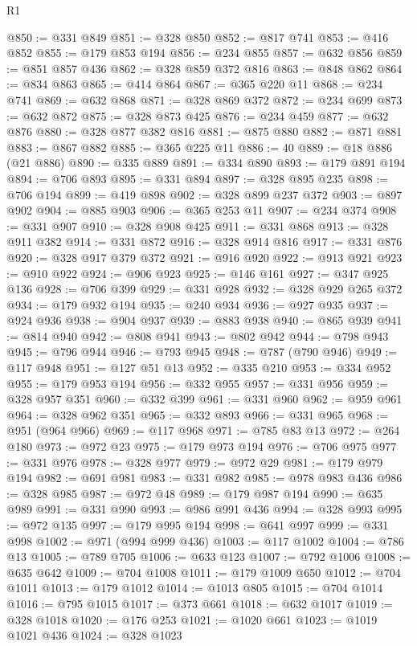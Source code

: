 \begin{lexlean}{R1}
\begin{coremodule}
@850 := @331 @849
@851 := @328 @850
@852 := @817 @741
@853 := @416 @852
@855 := @179 @853 @194
@856 := @234 @855
@857 := @632 @856
@859 := @851 @857 @436
@862 := @328 @859 @372 @816
@863 := @848 @862
@864 := @834 @863
@865 := @414 @864
@867 := @365 @220 @11
@868 := @234 @741
@869 := @632 @868
@871 := @328 @869 @372
@872 := @234 @699
@873 := @632 @872
@875 := @328 @873 @425
@876 := @234 @459
@877 := @632 @876
@880 := @328 @877 @382 @816
@881 := @875 @880
@882 := @871 @881
@883 := @867 @882
@885 := @365 @225 @11
@886 := 40
@889 := @18 @886 (@21 @886)
@890 := @335 @889
@891 := @334 @890
@893 := @179 @891 @194
@894 := @706 @893
@895 := @331 @894
@897 := @328 @895 @235
@898 := @706 @194
@899 := @419 @898
@902 := @328 @899 @237 @372
@903 := @897 @902
@904 := @885 @903
@906 := @365 @253 @11
@907 := @234 @374
@908 := @331 @907
@910 := @328 @908 @425
@911 := @331 @868
@913 := @328 @911 @382
@914 := @331 @872
@916 := @328 @914 @816
@917 := @331 @876
@920 := @328 @917 @379 @372
@921 := @916 @920
@922 := @913 @921
@923 := @910 @922
@924 := @906 @923
@925 := @146 @161
@927 := @347 @925 @136
@928 := @706 @399
@929 := @331 @928
@932 := @328 @929 @265 @372
@934 := @179 @932 @194
@935 := @240 @934
@936 := @927 @935
@937 := @924 @936
@938 := @904 @937
@939 := @883 @938
@940 := @865 @939
@941 := @814 @940
@942 := @808 @941
@943 := @802 @942
@944 := @798 @943
@945 := @796 @944
@946 := @793 @945
@948 := @787 (@790 @946)
@949 := @117 @948
@951 := @127 @51 @13
@952 := @335 @210
@953 := @334 @952
@955 := @179 @953 @194
@956 := @332 @955
@957 := @331 @956
@959 := @328 @957 @351
@960 := @332 @399
@961 := @331 @960
@962 := @959 @961
@964 := @328 @962 @351
@965 := @332 @893
@966 := @331 @965
@968 := @951 (@964 @966)
@969 := @117 @968
@971 := @785 @83 @13
@972 := @264 @180
@973 := @972 @23
@975 := @179 @973 @194
@976 := @706 @975
@977 := @331 @976
@978 := @328 @977
@979 := @972 @29
@981 := @179 @979 @194
@982 := @691 @981
@983 := @331 @982
@985 := @978 @983 @436
@986 := @328 @985
@987 := @972 @48
@989 := @179 @987 @194
@990 := @635 @989
@991 := @331 @990
@993 := @986 @991 @436
@994 := @328 @993
@995 := @972 @135
@997 := @179 @995 @194
@998 := @641 @997
@999 := @331 @998
@1002 := @971 (@994 @999 @436)
@1003 := @117 @1002
@1004 := @786 @13
@1005 := @789 @705
@1006 := @633 @123
@1007 := @792 @1006
@1008 := @635 @642
@1009 := @704 @1008
@1011 := @179 @1009 @650
@1012 := @704 @1011
@1013 := @179 @1012
@1014 := @1013 @805
@1015 := @704 @1014
@1016 := @795 @1015
@1017 := @373 @661
@1018 := @632 @1017
@1019 := @328 @1018
@1020 := @176 @253
@1021 := @1020 @661
@1023 := @1019 @1021 @436
@1024 := @328 @1023

\end{coremodule}
\end{lexlean}
